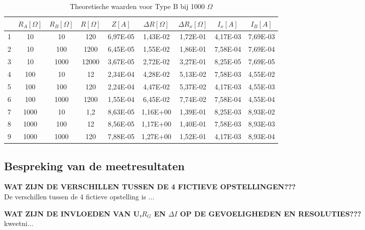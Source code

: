 \begin{table}[H]
    \centering
    \label{tab:TB1OO0}
    \caption{Theoretische waarden voor Type B bij 1000 $\Omega$}
    \begin{tabular}{| c | c | c | c | c | c | c | c | c |}
        \hline
                & $R_A [\Omega]$    & $R_B [\Omega]$    & $R [\Omega]$  & $Z [A]$   & $\Delta R [\Omega]$   & $\Delta R_x [\Omega]$ & $I_x [A]$                 & $I_B [A]$             \\ \hline
                1	&10	&10	&120	&6,97E-05	&1,43E-02	&1,72E-01	&4,17E-03	&7,69E-03 \\ \hline
                2	&10	&100	&1200	&6,45E-05	&1,55E-02	&1,86E-01	&7,58E-04	&7,69E-04\\ \hline
                3	&10	&1000	&12000	&3,67E-05	&2,72E-02	&3,27E-01	&8,25E-05	&7,69E-05\\ \hline
                4	&100	&10	&12	&2,34E-04	&4,28E-02	&5,13E-02	&7,58E-03	&4,55E-02\\ \hline
                5	&100	&100	&120	&2,24E-04	&4,47E-02	&5,37E-02	&4,17E-03	&4,55E-03\\ \hline
                6	&100	&1000	&1200	&1,55E-04	&6,45E-02	&7,74E-02	&7,58E-04	&4,55E-04\\ \hline
                7	&1000	&10	&1,2	&8,63E-05	&1,16E+00	&1,39E-01	&8,25E-03	&8,93E-02\\ \hline
                8	&1000	&100	&12	&8,56E-05	&1,17E+00	&1,40E-01	&7,58E-03	&8,93E-03\\ \hline
                9	&1000	&1000	&120	&7,88E-05	&1,27E+00	&1,52E-01	&4,17E-03	&8,93E-04  \\ \hline
    \end{tabular}
\end{table}
\subsection{Bespreking van de meetresultaten}
\textbf{WAT ZIJN DE VERSCHILLEN TUSSEN DE 4 FICTIEVE OPSTELLINGEN???}\\

De verschillen tussen de 4 fictieve opstelling is ... 

\textbf{WAT ZIJN DE INVLOEDEN VAN U,$R_G$ EN $\Delta I$ OP DE GEVOELIGHEDEN EN RESOLUTIES???}\\
kweetni...